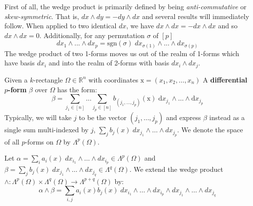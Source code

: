First of all, the wedge product is primarily defined by being \emph{anti-commutative} or \emph{skew-symmetric}.
That is, $dx \wedge dy = -dy \wedge dx$ and several results will immediately follow.
When applied to two identical $dx$, we have $dx \wedge dx = - dx \wedge dx$ and so $dx \wedge dx = 0$.
Additionally, for any permutation $\sigma$ of $[p]$
\begin{equation}
	dx_1 \wedge ... \wedge dx_p = \text{sgn}(\sigma) \; dx_{\sigma(1)} \wedge ... \wedge dx_{\sigma(p)}
\end{equation}
The wedge product of two 1-forms moves us out of the realm of 1-forms which have basis $dx_i$ and into the 
realm of 2-forms with basis $dx_i \wedge dx_j$.


\begin{definition}
	Given a $k$-rectangle $\Omega \in \mathbb{R}^n$ with coordinates $\text{x} = (x_1, x_2, \ldots, x_n)$
	A \textbf{differential $p$-form} $\beta$ over $\Omega$ has the form:
	\begin{equation}
		\beta = \sum_{j_1 \in [n]} \ldots \sum_{j_p \in [n]} b_{(j_1, \ldots, j_p)}(\text{x}) \; 
				\text{d} x_{j_1} \wedge \ldots \wedge \text{d} x_{j_p}
	\end{equation}
	Typically, we will take $j$ to be the vector $(j_1, \ldots, j_p)$ and express $\beta$ instead as a single sum multi-indexed
	by $j$, $\sum_j b_j(x) \; dx_{j_1} \wedge \ldots \wedge dx_{j_p}$.
	We denote the space of all $p$-forms on $\Omega$ by $\Lambda^p(\Omega)$.
\end{definition}


\begin{definition}
	Let $\alpha = \sum_i a_i(x) \; dx_{i_1} \wedge \ldots \wedge dx_{i_p} \in \Lambda^p(\Omega)$ and 
	$\beta = \sum_j b_j(x) \; dx_{j_1} \wedge \ldots \wedge dx_{j_q} \in \Lambda^q(\Omega)$. We extend the
	wedge product $\wedge : \Lambda^p(\Omega) \times \Lambda^q(\Omega) \to \Lambda^{p+q}(\Omega)$ by:
	\begin{equation}
		\alpha \wedge \beta  = \sum_{i,j} a_i(x) b_j(x) \; 
			dx_{i_1} \wedge \ldots \wedge dx_{i_p} \wedge 
			dx_{j_1} \wedge \ldots \wedge dx_{j_q}
	\end{equation}
\end{definition}

